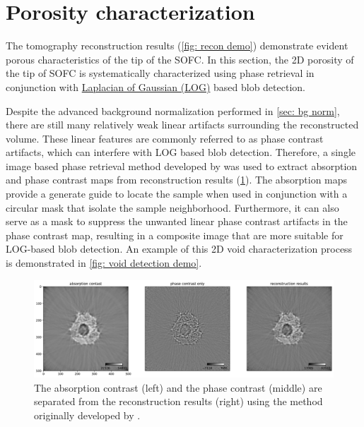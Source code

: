 \documentclass[12pt]{scrartcl}
\newcommand{\myscale}{1}
\begin{document}
\section{Porosity characterization}\label{sec: porosity characterization}

The tomography reconstruction results (\cref{fig: recon demo}) demonstrate evident porous characteristics of the tip of the SOFC.
In this section, the 2D porosity of the tip of SOFC is systematically characterized using phase retrieval in conjunction with \href{https://en.wikipedia.org/wiki/Blob_detection}{Laplacian of Gaussian (LOG)} based blob detection.

Despite the advanced background normalization performed in \cref{sec: bg norm}, there are still many relatively weak linear artifacts surrounding the reconstructed volume.
These linear features are commonly referred to as phase contrast artifacts, which can interfere with LOG based blob detection.
Therefore, a single image based phase retrieval method developed by \citet{Paganin_etal2002} was used to extract absorption and phase contrast maps from reconstruction results (\cref{fig: phase retrieval demo}).
The absorption maps provide a generate guide to locate the sample when used in conjunction with a circular mask that isolate the sample neighborhood.
Furthermore, it can also serve as a mask to suppress the unwanted linear phase contrast artifacts in the phase contrast map, resulting in a composite image that are more suitable for LOG-based blob detection.
An example of this 2D void characterization process is demonstrated in \cref{fig: void detection demo}.

\renewcommand{\myscale}{0.42}
\begin{figure}[htp]
\centering
\includegraphics[scale=\myscale]{phaseRetrievalDemo}
\caption{
The absorption contrast (left) and the phase contrast (middle) are separated from the reconstruction results (right) using the method originally developed by \citet{Paganin_etal2002}.
}\label{fig: phase retrieval demo}
\end{figure}
\end{document}

